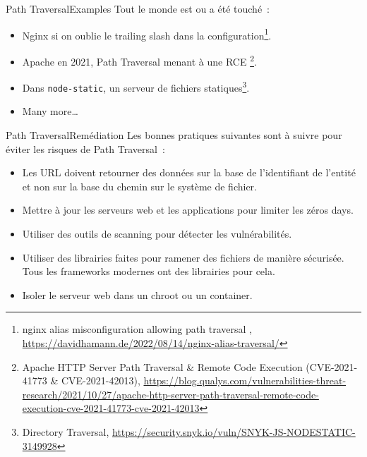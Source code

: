 \documentclass{beamer}
\begin{document}
    \begin{frame}{Path Traversal}{Examples}
        Tout le monde est ou a été touché~:
        \begin{itemize}
            \item Nginx si on oublie le trailing slash dans la configuration\footnote{nginx alias misconfiguration allowing path traversal , \url{https://davidhamann.de/2022/08/14/nginx-alias-traversal/}}.
            \item Apache en 2021, Path Traversal menant à une RCE \footnote{Apache HTTP Server Path Traversal \& Remote Code Execution (CVE-2021-41773 \& CVE-2021-42013), \url{https://blog.qualys.com/vulnerabilities-threat-research/2021/10/27/apache-http-server-path-traversal-remote-code-execution-cve-2021-41773-cve-2021-42013}}.
            \item Dans \lstinline{node-static}, un serveur de fichiers statiques\footnote{Directory Traversal, \url{https://security.snyk.io/vuln/SNYK-JS-NODESTATIC-3149928}}.
            \item Many more\ldots
        \end{itemize}
    \end{frame}

    \begin{frame}{Path Traversal}{Remédiation}
        Les bonnes pratiques suivantes sont à suivre pour éviter les risques de Path Traversal~:
        \begin{itemize}
            \item Les URL doivent retourner des données sur la base de l'identifiant de l'entité et non sur la base du chemin sur le système de fichier.
            \item Mettre à jour les serveurs web et les applications pour limiter les zéros days.
            \item Utiliser des outils de scanning pour détecter les vulnérabilités.
            \item Utiliser des librairies faites pour ramener des fichiers de manière sécurisée.
            Tous les frameworks modernes ont des librairies pour cela.
            \item Isoler le serveur web dans un chroot ou un container.
        \end{itemize}
    \end{frame}
\end{document}
